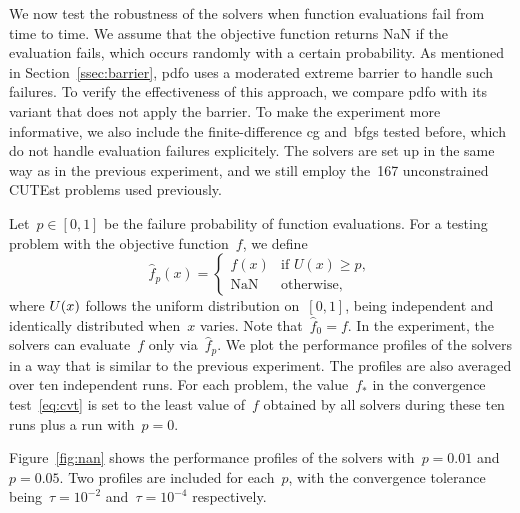 \documentclass[
    smallextended,  %
    final,          %
]{svjour3}
\newcommand{\iter}[1][k]{x\ifthenelse{\equal{#1}{}}{}{_{#1}}}
\newcommand{\obj}{f}
\newcommand{\modified}[1]{\texorpdfstring{{\color{RoyalBlue}#1}}{#1}}
\begin{document}
We now test the robustness of the solvers when function evaluations fail from time to time.
We assume that the objective function returns NaN if the evaluation fails, which occurs randomly with a certain probability.
As mentioned in Section~\ref{ssec:barrier}, \gls{pdfo} uses a moderated extreme barrier to handle such failures.
To verify the effectiveness of this approach, we compare \gls{pdfo} with its variant that does not apply the barrier.
To make the experiment more informative, we also include the finite-difference \gls{cg} and~\gls{bfgs} tested before, which do not handle evaluation failures \modified{explicitely}.
The solvers are set up in the same way as in the previous experiment, and we still employ the~\modified{\num{167}} unconstrained CUTEst problems used previously.

Let~$p \in [0,1]$ be the failure probability of function evaluations.
For a testing problem with the objective function~$\obj$, we define
\begin{equation}
    \label{eq:nan-obj}
    \hat{\obj}_p(x) = \begin{cases}
        \obj(x)     & \text{if~$U(x) \ge p$},\\[0.5ex]
        \text{NaN}  & \text{otherwise},
    \end{cases}
\end{equation}
where $U(\iter[])$ follows the uniform distribution on~$[0,1]$, being independent and identically distributed when~$x$ varies.
Note that~$\hat{\obj}_0 = f$.
In the experiment, the solvers can evaluate~$\obj$ only via~$\hat{\obj}_p$.
We plot the performance profiles of the solvers in a way that is similar to the previous experiment.
The profiles are also averaged over ten independent runs.
For each problem, the value~$\obj_{\ast}$ in the convergence test~\eqref{eq:cvt} is set to the least value of~$\obj$ obtained by all solvers during these ten runs plus a run with~$p = 0$.

Figure~\ref{fig:nan} shows the performance profiles of the solvers with~$p = 0.01$ and~$p=0.05$.
Two profiles are included for each~$p$, with the convergence tolerance being~$\tau = 10^{-2}$ and~$\tau = 10^{-4}$ respectively.
\end{document}
